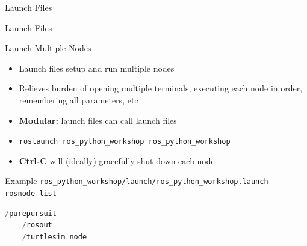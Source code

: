 \documentclass[9pt]{beamer}
\begin{document}
\begin{section}{Launch Files}
    \begin{frame}[fragile]{Launch Files}
        \begin{block}{Launch Multiple Nodes}
            \begin{itemize}
                \item Launch files setup and run multiple nodes
                \item Relieves burden of opening multiple terminals, executing each node in order, remembering all parameters, etc
                \item \textbf{Modular:} launch files can call launch files
                \item \lstinline{roslaunch ros_python_workshop ros_python_workshop}
                \item \textbf{Ctrl-C} will (ideally) gracefully shut down each node
            \end{itemize}
        \end{block}
        \begin{block}{Example}
            \lstinline{ros_python_workshop/launch/ros_python_workshop.launch} \\
            \lstinline{rosnode list}
            \begin{lstlisting}[language=Python]
    /purepursuit
    /rosout
    /turtlesim_node
            \end{lstlisting}
        \end{block}
    \end{frame}
\end{section}
\end{document}
